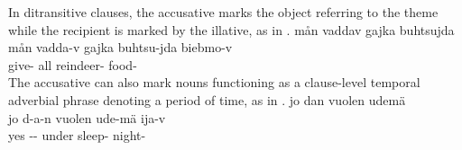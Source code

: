 In ditransitive clauses, the accusative marks the object referring to the theme while the recipient is marked by the illative, as in .
\ea\label{acc2}
\glll	mån vaddav gajka buhtsujda \\ %
	mån vadda-v gajka buhtsu-jda biebmo-v\\
	 give- all\BS{} reindeer- food-\\\nopagebreak
{} 
\z
The accusative can also mark nouns functioning as a clause-level temporal adverbial phrase denoting a period of time, %
as in .%
\ea\label{acc3}
\glll	jo dan vuolen udemä \\ %
	jo d-a-n vuolen ude-mä ija-v\\
	yes -- under sleep- night-\\\nopagebreak
{} 
\z


